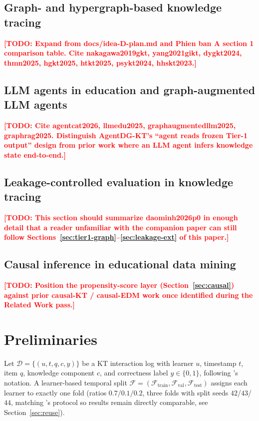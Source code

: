 \documentclass[journal]{IEEEtran}
\newcommand{\todo}[1]{\textcolor{red}{\textbf{[TODO: #1]}}}
\begin{document}
\subsection{Graph- and hypergraph-based knowledge tracing}
\todo{Expand from docs/idea-D-plan.md and Phien ban A section 1 comparison
table. Cite nakagawa2019gkt, yang2021gikt, dygkt2024, thmn2025, hgkt2025,
htkt2025, psykt2024, hhskt2023.}

\subsection{LLM agents in education and graph-augmented LLM agents}
\todo{Cite agentcat2026, llmedu2025, graphaugmentedllm2025, graphrag2025.
Distinguish AgentDG-KT's ``agent reads frozen Tier-1 output'' design from
prior work where an LLM agent infers knowledge state end-to-end.}

\subsection{Leakage-controlled evaluation in knowledge tracing}
\todo{This section should summarize daominh2026p0 in enough detail that a
reader unfamiliar with the companion paper can still follow
Sections~\ref{sec:tier1-graph}--\ref{sec:leakage-ext} of this paper.}

\subsection{Causal inference in educational data mining}
\todo{Position the propensity-score layer (Section~\ref{sec:causal})
against prior causal-KT / causal-EDM work once identified during the
Related Work pass.}

\section{Preliminaries}

Let $\mathcal{D} = \{(u, t, q, c, y)\}$ be a KT interaction log with learner
$u$, timestamp $t$, item $q$, knowledge component $c$, and correctness label
$y \in \{0, 1\}$, following \cite{daominh2026p0}'s notation. A learner-based
temporal split $\mathcal{F} = (\mathcal{F}_{\mathrm{train}},
\mathcal{F}_{\mathrm{val}}, \mathcal{F}_{\mathrm{test}})$ assigns each
learner to exactly one fold (ratios $0.7/0.1/0.2$, three folds with split
seeds $42$/$43$/$44$, matching \cite{daominh2026p0}'s protocol so results
remain directly comparable, see Section~\ref{sec:reuse}).
\end{document}
